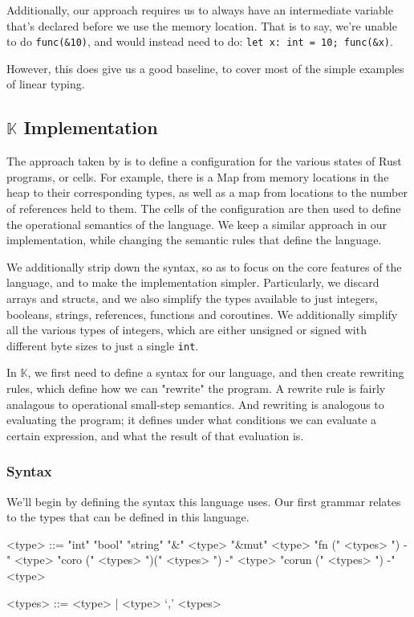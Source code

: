\documentclass[review,twocolumn]{sigplanconf}
\begin{document}
Additionally, our approach requires us to always have an intermediate variable that's declared before we use the memory location. That is to say, we're unable to do \verb!func(&10)!, and would instead need to do:
\verb!let x: int = 10; func(&x)!.

However, this does give us a good baseline, to cover most of the simple examples of linear typing.

\subsection{$\mathbb{K}$ Implementation}

The approach taken by \citet{Krust2018} is to define a configuration for the various states of Rust programs, or cells. For example, there is a Map from memory locations in the heap to their corresponding types, as well as a map from locations to the number of references held to them. The cells of the configuration are then used to define the operational semantics of the language. We keep a similar approach in our implementation, while changing the semantic rules that define the language.

We additionally strip down the syntax, so as to focus on the core features of the language, and to make the implementation simpler. Particularly, we discard arrays and structs, and we also simplify the types available to just integers, booleans, strings, references, functions and coroutines. We additionally simplify all the various types of integers, which are either unsigned or signed with different byte sizes to just a single \verb!int!.

In $\mathbb{K}$, we first need to define a syntax for our language, and then create rewriting rules, which define how we can "rewrite" the program. A rewrite rule is fairly analagous to operational small-step semantics. And rewriting is analogous to evaluating the program; it defines under what conditions we can evaluate a certain expression, and what the result of that evaluation is.

\newpage
\subsubsection{Syntax}

We'll begin by defining the syntax this language uses. Our first grammar relates to the types that can be defined in this language.

\begin{grammar}
  <type> ::= "int"
  \alt "bool"
  \alt "string"
  \alt "&" <type>
  \alt "&mut" <type>
  \alt "fn (" <types> ") -\>" <type>
  \alt "coro (" <types> ")(" <types> ") -\>" <type>
  \alt "corun (" <types> ") -\>" <type>

  <types> ::= <type> | <type> ‘,’ <types>
\end{grammar}
\end{document}
